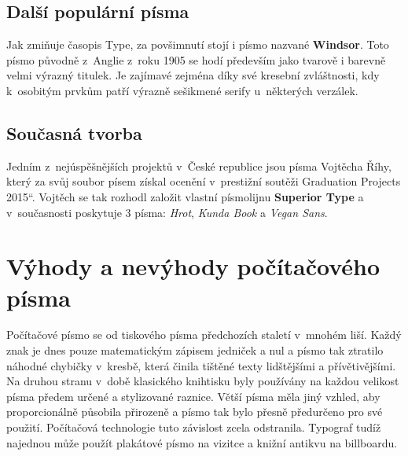 \documentclass[11pt, a4paper]{article}
\providecommand{\uv}[1]{\quotedblbase #1\textquotedblleft}
\begin{document}
\subsection{Další populární písma}
Jak zmiňuje časopis Type, za povšimnutí stojí i písmo nazvané \textbf{Windsor}. Toto písmo původně z~Anglie z~roku 1905 se hodí především jako tvarově i barevně velmi výrazný titulek. Je zajímavé zejména díky své kresební zvláštnosti, kdy k~osobitým prvkům patří výrazně sešikmené serify u~některých verzálek.\cite{font_2012}

\subsection{Současná tvorba}
Jedním z~nejúspěšnějších projektů v~České republice jsou písma Vojtěcha Říhy, který za svůj soubor písem získal ocenění v~prestižní soutěži \uv{Graduation Projects 2015}. Vojtěch se tak rozhodl založit vlastní písmolijnu \textbf{Superior Type} a v~současnosti poskytuje 3 písma: \emph{Hrot}, \emph{Kunda Book} a \emph{Vegan Sans}.\cite{font_2016}

\section{Výhody a nevýhody počítačového písma}

Počítačové písmo se od tiskového písma předchozích staletí v~mnohém liší. Každý znak je dnes pouze matematickým zápisem jedniček a nul a písmo tak ztratilo náhodné chybičky v~kresbě, která činila tištěné texty lidštějšími a přívětivějšími. Na druhou stranu v~době klasického knihtisku byly používány na každou velikost písma předem určené a stylizované raznice. Větší písma měla jiný vzhled, aby proporcionálně působila přirozeně a písmo tak bylo přesně předurčeno pro své použití. Počítačová technologie tuto závislost zcela odstranila. Typograf tudíž najednou může použít plakátové písmo na vizitce a knižní antikvu na billboardu.\cite{zivy_font}


\pagebreak



\end{document}

